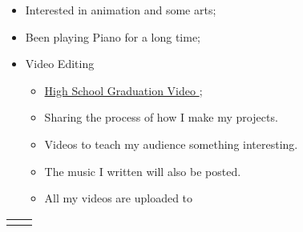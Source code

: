   \begin{itemize}[itemsep=0.1\parskip]
    \item Interested in animation and some arts; 
    \item Been playing Piano for a long time;
    \item Video Editing
    \begin{itemize}
      \item \href{https://www.bilibili.com/video/av55212868/}{\color{link}High School Graduation Video \bilibiliicon{}};
      \item Sharing the process of how I make my projects.
      \item Videos to teach my audience something interesting.
      \item The music I written will also be posted.
      \item All my videos are uploaded to \href{https://www.bilibili.com/}{\bilibiliicon{}\bilibiliwordicon{}}
    \end{itemize}
  \end{itemize}
  \mbox{}
  \vfill{
    \begin{flushright}
      \begin{tabular}{ c c }
        \bilishield{} & \gitshield{}
      \end{tabular}
    \end{flushright}
  }

